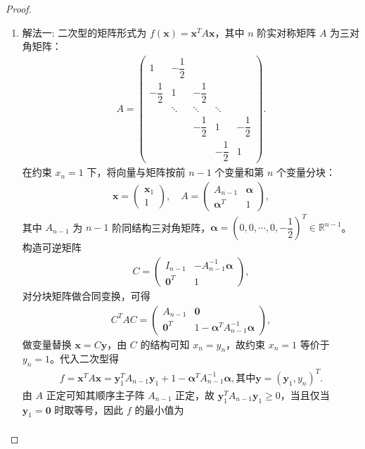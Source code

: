 \documentclass[../../main.tex]{subfiles}%
\begin{document}
\begin{proof}
\begin{enumerate}[(1)]
\item {\color{blue}解法一:}
二次型的矩阵形式为 $f(\bm{x}) = \bm{x}^T A \bm{x}$，其中 $n$ 阶实对称矩阵 $A$ 为三对角矩阵：
\begin{align*}
A = \begin{pmatrix}
1 & -\dfrac{1}{2} & & & \\
-\dfrac{1}{2} & 1 & -\dfrac{1}{2} & & \\
& \ddots & \ddots & \ddots & \\
& & -\dfrac{1}{2} & 1 & -\dfrac{1}{2} \\
& & & -\dfrac{1}{2} & 1
\end{pmatrix}.
\end{align*}
在约束 $x_n=1$ 下，将向量与矩阵按前 $n-1$ 个变量和第 $n$ 个变量分块：
\begin{align*}
\bm{x} = \begin{pmatrix} \bm{x}_1 \\ 1 \end{pmatrix}, \quad
A = \begin{pmatrix} A_{n-1} & \bm{\alpha} \\ \bm{\alpha}^T & 1 \end{pmatrix},
\end{align*}
其中 $A_{n-1}$ 为 $n-1$ 阶同结构三对角矩阵，$\bm{\alpha} = \left(0,0,\cdots,0,-\dfrac{1}{2}\right)^T \in \mathbb{R}^{n-1}$。
构造可逆矩阵
\begin{align*}
C = \begin{pmatrix} I_{n-1} & -A_{n-1}^{-1}\bm{\alpha} \\ \bm{0}^T & 1 \end{pmatrix},
\end{align*}
对分块矩阵做合同变换，可得
\begin{align*}
C^T A C = \begin{pmatrix} A_{n-1} & \bm{0} \\ \bm{0}^T & 1 - \bm{\alpha}^T A_{n-1}^{-1}\bm{\alpha} \end{pmatrix},
\end{align*}
做变量替换 $\bm{x} = C\bm{y}$，由 $C$ 的结构可知 $x_n = y_n$，故约束 $x_n=1$ 等价于 $y_n=1$。代入二次型得
\begin{align*}
f =\bm{x}^T A\bm{x}= \bm{y}_1^T A_{n-1} \bm{y}_1 + 1 - \bm{\alpha}^T A_{n-1}^{-1}\bm{\alpha},\text{其中}\bm{y} = (\bm{y}_1,y_{n})^T.
\end{align*}
由 $A$ 正定可知其顺序主子阵 $A_{n-1}$ 正定，故 $\bm{y}_1^T A_{n-1} \bm{y}_1 \geqslant 0$，当且仅当 $\bm{y}_1 = \bm{0}$ 时取等号，因此 $f$ 的最小值为
\begin{align*}

\end{align*}
\end{enumerate}
\end{proof}
\end{document}
